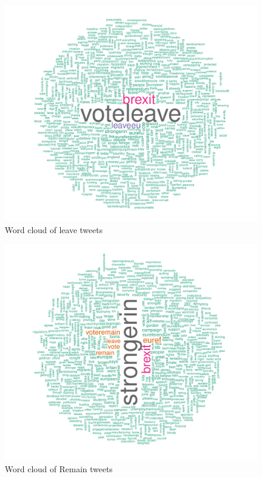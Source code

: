 \documentclass[10pt  ,usenames, dvipsnames]{article}\usepackage[]{graphicx}\usepackage[]{color}
\newenvironment{knitrout}{}{} %
\begin{document}
\begin{figure}[H]
\begin{center}
\begin{knitrout}
\color{fgcolor}
\includegraphics[width=.80\linewidth]{figure/unnamed-chunk-76-1} 

\end{knitrout}
\caption {Word cloud of leave tweets}
\label{fig3}
\end {center}
\end {figure}


\begin{figure}[H]
\begin{center}
\begin{knitrout}
\color{fgcolor}
\includegraphics[width=.80\linewidth]{figure/unnamed-chunk-77-1} 

\end{knitrout}
\caption {Word cloud of Remain tweets}
\label{fig4}
\end {center}
\end {figure}
\end{document}
